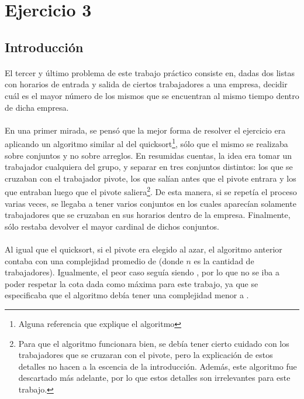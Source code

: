 \section{Ejercicio 3}

\subsection{Introducción}

\paragraph{}
El tercer y \'ultimo problema de este trabajo pr\'actico consiste en, dadas dos listas con horarios de entrada y salida de ciertos trabajadores a una empresa, decidir cu\'al es el mayor n\'umero de los mismos que se encuentran al mismo tiempo dentro de dicha empresa.

\paragraph{}
En una primer mirada, se pens\'o que la mejor forma de resolver el ejercicio era aplicando un algoritmo similar al del quicksort\footnote{Alguna referencia que explique el algoritmo}, s\'olo que el mismo se realizaba sobre conjuntos y no sobre arreglos. En resumidas cuentas, la idea era tomar un trabajador cualquiera del grupo, y separar en tres conjuntos distintos: los que se cruzaban con el trabajador pivote, los que sal\'ian antes que el pivote entrara y los que entraban luego que el pivote saliera\footnote{Para que el algoritmo funcionara bien, se deb\'ia tener cierto cuidado con los trabajadores que se cruzaran con el pivote, pero la explicaci\'on de estos detalles no hacen a la escencia de la introducci\'on. Adem\'as, este algoritmo fue descartado m\'as adelante, por lo que estos detalles son irrelevantes para este trabajo.}. De esta manera, si se repet\'ia el proceso varias veces, se llegaba a tener varios conjuntos en los cuales aparec\'ian solamente trabajadores que se cruzaban en sus horarios dentro de la empresa. Finalmente, s\'olo restaba devolver el mayor cardinal de dichos conjuntos.

\paragraph{}
Al igual que el quicksort, si el pivote era elegido al azar, el algoritmo anterior contaba con una complejidad promedio de  (donde $n$ es la cantidad de trabajadores).  Igualmente, el peor caso segu\'ia siendo , por lo que no se iba a poder respetar la cota dada como m\'axima para este trabajo, ya que se especificaba que el algoritmo deb\'ia tener una complejidad menor a .

